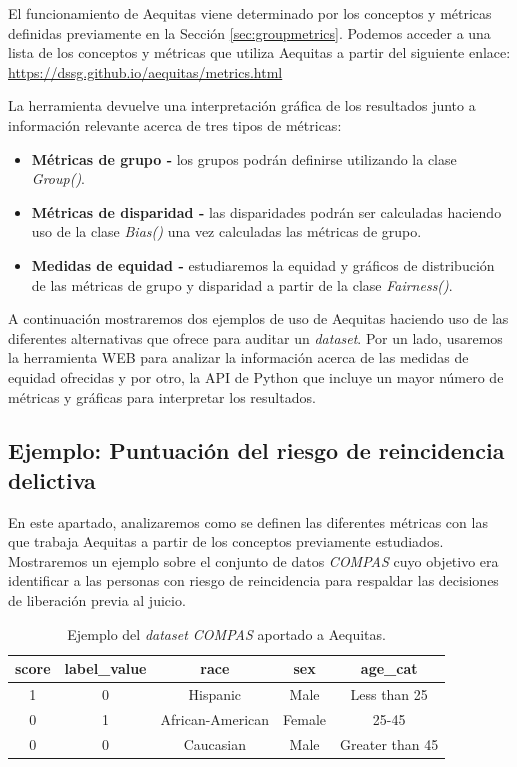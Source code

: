 El funcionamiento de Aequitas viene determinado por los conceptos y métricas definidas previamente en la Sección \ref{sec:groupmetrics}. Podemos acceder a una lista de los conceptos y métricas que utiliza Aequitas a partir del siguiente enlace: \url{https://dssg.github.io/aequitas/metrics.html}

La herramienta devuelve una interpretación gráfica de los resultados junto a información relevante acerca de tres tipos de métricas:

\begin{itemize}
    \item \textbf{Métricas de grupo -} los grupos podrán definirse utilizando la clase \textit{Group()}.
    \item \textbf{Métricas de disparidad -} las disparidades podrán ser calculadas haciendo uso de la clase \textit{Bias()} una vez calculadas las métricas de grupo.
    \item \textbf{Medidas de equidad -} estudiaremos la equidad y gráficos de distribución de las métricas de grupo y disparidad a partir de la clase \textit{Fairness()}.
\end{itemize}

A continuación mostraremos dos ejemplos de uso de Aequitas haciendo uso de las diferentes alternativas que ofrece para auditar un \textit{dataset}. Por un lado, usaremos la herramienta WEB para analizar la información acerca de las medidas de equidad ofrecidas y por otro, la API de Python que incluye un mayor número de métricas y gráficas para interpretar los resultados.

\subsection{Ejemplo: Puntuación del riesgo de reincidencia delictiva}

En este apartado, analizaremos como se definen las diferentes métricas con las que trabaja Aequitas a partir de los conceptos previamente estudiados. Mostraremos un ejemplo sobre el conjunto de datos \textit{COMPAS} cuyo objetivo era identificar a las personas con riesgo de reincidencia para respaldar las decisiones de liberación previa al juicio.\\

\begin{table}[h]
\centering
\resizebox{12.4cm}{!} {
\begin{tabular}{|c|c|c|c|c|}
\hline
\textbf{score} & \textbf{label\_value} & \textbf{race}    & \textbf{sex} & \textbf{age\_cat} \\ \hline
1            & 0                     & Hispanic & Male       & Less than 25             \\ \hline
0              & 1                     & African-American         & Female         & 25-45     \\ \hline
0              & 0                     & Caucasian       & Male         & Greater than 45            \\ \hline
\end{tabular}
}
\caption{Ejemplo del \textit{dataset COMPAS} aportado a Aequitas.}
\label{tab:ejcompasaeq}
\end{table}

